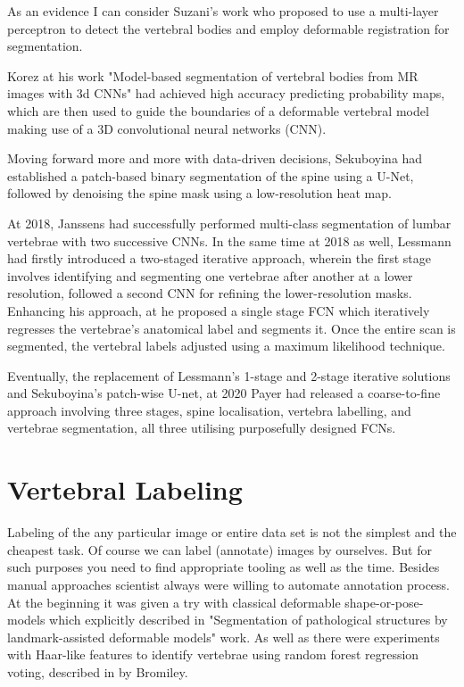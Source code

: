 As an evidence I can consider Suzani's work \cite{Suzani2015} who proposed to use a multi-layer perceptron to detect the vertebral bodies and employ deformable registration for segmentation. 

Korez \cite{Korez2016} at his work "Model-based segmentation of vertebral bodies from MR images with 3d CNNs" had achieved high accuracy predicting probability maps, which are then used to guide the boundaries of a deformable vertebral model making use of a 3D convolutional neural networks (CNN). 

Moving forward more and more with data-driven decisions, Sekuboyina \cite{Sekuboyina2018} had established a patch-based binary segmentation of the spine using a U-Net, followed by denoising the spine mask using a low-resolution heat map.

At 2018, Janssens \cite{Janssens2018} had successfully performed multi-class segmentation of lumbar vertebrae with two successive CNNs. In the same time at 2018 as well, Lessmann \cite{Lessmann2019} had firstly introduced a two-staged iterative approach, wherein the first stage involves identifying and segmenting one vertebrae after another at a lower resolution, followed a second CNN for refining the lower-resolution masks. Enhancing his approach, at \cite{Lessmann2019} he proposed a single stage FCN which iteratively regresses the vertebrae’s anatomical label and
segments it. Once the entire scan is segmented, the vertebral labels adjusted using a maximum likelihood
technique. 

Eventually, the replacement of Lessmann's 1-stage and 2-stage iterative solutions and Sekuboyina's patch-wise U-net, at 2020 Payer \cite{Payer2020} had released a coarse-to-fine approach involving three stages, spine localisation, vertebra labelling, and vertebrae segmentation, all three utilising purposefully designed FCNs.

\section{Vertebral Labeling}
Labeling of the any particular image or entire data set is not the simplest and the cheapest task. Of course we can label (annotate) images by ourselves. But for such purposes you need to find appropriate tooling as well as the time. Besides manual approaches scientist always were willing to automate annotation process. At the beginning it was given a try with classical
deformable shape-or-pose-models which explicitly described in "Segmentation of pathological structures by
landmark-assisted deformable models" \cite{Ibragimov2017} work. As well as there were experiments with Haar-like features to identify vertebrae using random forest regression voting, described in \cite{Bromiley2016} by Bromiley.

